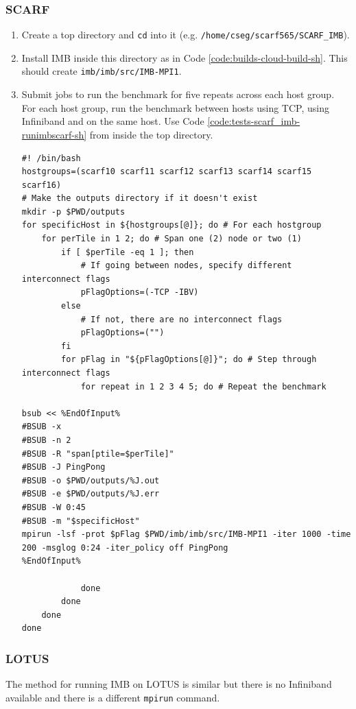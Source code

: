 \documentclass{article}
\newenvironment{code}{\captionsetup{type=listing}}{}
\begin{document}
        \subsubsection{SCARF}
            \begin{enumerate}
                \item Create a top directory and \verb|cd| into it (e.g. \verb|/home/cseg/scarf565/SCARF_IMB|).
                \item Install IMB inside this directory as in Code \ref{code:builds-cloud-build-sh}. This should create \verb|imb/imb/src/IMB-MPI1|.
                \item Submit jobs to run the benchmark for five repeats across each host group. For each host group, run the benchmark between hosts using TCP, using Infiniband and on the same host. Use Code \ref{code:tests-scarf_imb-runimbscarf-sh} from inside the top directory.
                    \begin{code}
                    \begin{verbatim}
#! /bin/bash
hostgroups=(scarf10 scarf11 scarf12 scarf13 scarf14 scarf15 scarf16)
# Make the outputs directory if it doesn't exist
mkdir -p $PWD/outputs
for specificHost in ${hostgroups[@]}; do # For each hostgroup
    for perTile in 1 2; do # Span one (2) node or two (1)
        if [ $perTile -eq 1 ]; then
            # If going between nodes, specify different interconnect flags
            pFlagOptions=(-TCP -IBV)
        else
            # If not, there are no interconnect flags
            pFlagOptions=("")
        fi
        for pFlag in "${pFlagOptions[@]}"; do # Step through interconnect flags
            for repeat in 1 2 3 4 5; do # Repeat the benchmark

bsub << %EndOfInput%
#BSUB -x
#BSUB -n 2
#BSUB -R "span[ptile=$perTile]"
#BSUB -J PingPong
#BSUB -o $PWD/outputs/%J.out
#BSUB -e $PWD/outputs/%J.err
#BSUB -W 0:45
#BSUB -m "$specificHost"
mpirun -lsf -prot $pFlag $PWD/imb/imb/src/IMB-MPI1 -iter 1000 -time 200 -msglog 0:24 -iter_policy off PingPong
%EndOfInput%

            done
        done
    done
done
                \end{verbatim}
                \label{code:tests-scarf_imb-runimbscarf-sh}
                \end{code}
            \end{enumerate}
        \subsubsection{LOTUS}
            The method for running IMB on LOTUS is similar but there is no Infiniband available and there is a different \verb|mpirun| command.
\end{document}
